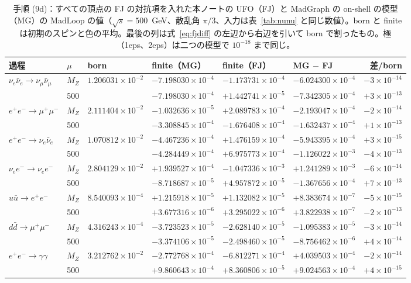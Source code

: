 \documentclass[a4paper,10pt]{ltjsarticle}
\begin{document}
\begin{table}[tbp]
\centering\footnotesize
\caption{手順 (9d)：すべての頂点の FJ の対抗項を入れた本ノートの UFO（FJ）と MadGraph の on-shell の模型（MG）の MadLoop の値（$\sqrt s=500$~GeV、散乱角 $\pi/3$、入力は表~\ref{tab:nunu} と同じ数値）。born と finite は初期のスピンと色の平均。最後の列は式~\eqref{eq:fjdiff} の左辺から右辺を引いて born で割ったもの。極（1eps、2eps）は二つの模型で $10^{-18}$ まで同じ。}
\label{tab:fjall}
\begin{tabular}{llllllr}
\toprule
過程 & $\mu$ & born & finite（MG） & finite（FJ） & MG $-$ FJ & 差/born \\
\midrule
$\nu_e\bar\nu_e\to\nu_\mu\bar\nu_\mu$ & $M_Z$ & $1.206031\times10^{-2}$ & $-7.198030\times10^{-4}$ & $-1.173731\times10^{-4}$ & $-6.024300\times10^{-4}$ & $-3\times10^{-14}$ \\
 & 500 &  & $-7.198030\times10^{-4}$ & $+1.442741\times10^{-5}$ & $-7.342305\times10^{-4}$ & $+3\times10^{-13}$ \\
$e^+e^-\to\mu^+\mu^-$ & $M_Z$ & $2.111404\times10^{-2}$ & $-1.032636\times10^{-5}$ & $+2.089783\times10^{-4}$ & $-2.193047\times10^{-4}$ & $-2\times10^{-14}$ \\
 & 500 &  & $-3.308845\times10^{-4}$ & $-1.676408\times10^{-4}$ & $-1.632437\times10^{-4}$ & $+1\times10^{-13}$ \\
$e^+e^-\to\nu_e\bar\nu_e$ & $M_Z$ & $1.070812\times10^{-2}$ & $-4.467236\times10^{-4}$ & $+1.476159\times10^{-4}$ & $-5.943395\times10^{-4}$ & $+3\times10^{-15}$ \\
 & 500 &  & $-4.284449\times10^{-4}$ & $+6.975773\times10^{-4}$ & $-1.126022\times10^{-3}$ & $-4\times10^{-13}$ \\
$\nu_ee^-\to\nu_ee^-$ & $M_Z$ & $2.804129\times10^{-2}$ & $+1.939527\times10^{-4}$ & $-1.047336\times10^{-3}$ & $+1.241289\times10^{-3}$ & $-6\times10^{-14}$ \\
 & 500 &  & $-8.718687\times10^{-5}$ & $+4.957872\times10^{-5}$ & $-1.367656\times10^{-4}$ & $+7\times10^{-13}$ \\
$u\bar u\to e^+e^-$ & $M_Z$ & $8.540093\times10^{-4}$ & $+1.215918\times10^{-5}$ & $+1.132082\times10^{-5}$ & $+8.383674\times10^{-7}$ & $-5\times10^{-15}$ \\
 & 500 &  & $+3.677316\times10^{-6}$ & $+3.295022\times10^{-6}$ & $+3.822938\times10^{-7}$ & $-2\times10^{-13}$ \\
$d\bar d\to\mu^+\mu^-$ & $M_Z$ & $4.316243\times10^{-4}$ & $-3.723523\times10^{-5}$ & $-2.628140\times10^{-5}$ & $-1.095383\times10^{-5}$ & $-3\times10^{-14}$ \\
 & 500 &  & $-3.374106\times10^{-5}$ & $-2.498460\times10^{-5}$ & $-8.756462\times10^{-6}$ & $+4\times10^{-14}$ \\
$e^+e^-\to\gamma\gamma$ & $M_Z$ & $3.212762\times10^{-2}$ & $-2.772768\times10^{-4}$ & $-6.812271\times10^{-4}$ & $+4.039503\times10^{-4}$ & $-2\times10^{-14}$ \\
 & 500 &  & $+9.860643\times10^{-4}$ & $+8.360806\times10^{-5}$ & $+9.024563\times10^{-4}$ & $+4\times10^{-15}$ \\
\bottomrule
\end{tabular}
\end{table}
\end{document}
